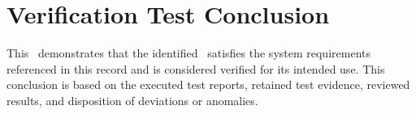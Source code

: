 \newpage
\section{Verification Test Conclusion}
This \stdRptPkg\ demonstrates that the identified \stdCfgItem\ satisfies the
system requirements referenced in this record and is considered verified for its
intended use.  This conclusion is based on the executed test reports, retained
test evidence, reviewed results, and disposition of deviations or anomalies.
